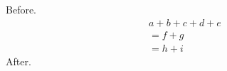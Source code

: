 \documentclass[10pt]{article}
\begin{document}
Before.
\begin{multline} a + b + c + d + e \tag{M $x$} \\ = f + g \\ = h + i \end{multline}
After.
\end{document}
